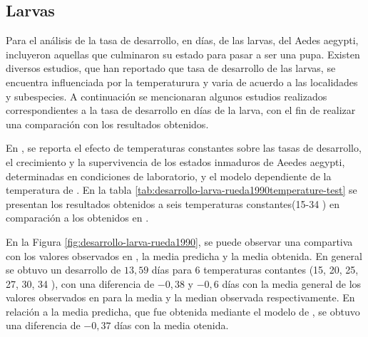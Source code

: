 \subsection{Larvas}
Para el análisis de la tasa de desarrollo, en días, de las larvas, del Aedes aegypti, incluyeron
aquellas que culminaron su estado para pasar a ser una pupa. Existen diversos
estudios, que han reportado que tasa de desarrollo de las larvas, se encuentra influenciada por la
temperaturura y varia de acuerdo a las localidades y subespecies. A continuación se mencionaran
algunos estudios realizados correspondientes a la tasa de desarrollo en días de la larva, con el
fin de realizar una comparación con los resultados obtenidos.

En \cite{rueda1990temperature}, se reporta el efecto de  temperaturas constantes sobre las tasas
de desarrollo, el crecimiento y la supervivencia de los estados inmaduros de Aeedes aegypti,
determinadas en condiciones de laboratorio, y el modelo dependiente de la temperatura de
\cite{sharpe1977reaction}. En la tabla \ref{tab:desarrollo-larva-rueda1990temperature-test} se
presentan los resultados obtenidos a seis temperaturas constantes(15-34 \textcelsius) en
comparación a los obtenidos en \cite{rueda1990temperature}.

En la Figura \ref{fig:desarrollo-larva-rueda1990}, se puede observar una compartiva con los
valores observados en \cite{rueda1990temperature}, la media predicha y la media obtenida. En
general se obtuvo un desarrollo de $13,59$ días para 6 temperaturas contantes (15, 20, 25, 27,
30, 34 \textcelsius), con una diferencia de $-0,38$ y $-0,6$ días con la media general de los
valores observados en \cite{rueda1990temperature} para la media y la median observada respectivamente. En relación a la media predicha, que fue obtenida mediante el modelo de
\cite{sharpe1977reaction}, se obtuvo una diferencia de $-0,37$ días con la media otenida.

